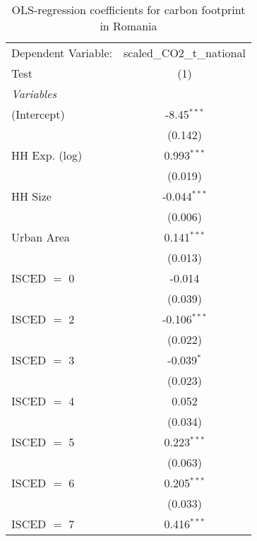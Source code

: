 
\begin{table}[htbp!]
   \centering
   \small
   \begin{adjustbox}{width = 1\textwidth, max height = 0.95\textheight, center}
      \begin{threeparttable}[b]
         \caption{\label{tab:OLS_2_ROU} OLS-regression coefficients for carbon footprint in Romania}
         \begin{tabular}{lc}
            \tabularnewline \midrule \midrule
            Dependent Variable: & scaled\_CO2\_t\_national\\     
            Test                & (1)\\  
            \midrule
            \emph{Variables}\\
            (Intercept)         & -8.45$^{***}$\\   
                                & (0.142)\\   
            HH Exp. (log)       & 0.993$^{***}$\\   
                                & (0.019)\\   
            HH Size             & -0.044$^{***}$\\   
                                & (0.006)\\   
            Urban Area          & 0.141$^{***}$\\   
                                & (0.013)\\   
            ISCED $=$ 0         & -0.014\\   
                                & (0.039)\\   
            ISCED $=$ 2         & -0.106$^{***}$\\   
                                & (0.022)\\   
            ISCED $=$ 3         & -0.039$^{*}$\\   
                                & (0.023)\\   
            ISCED $=$ 4         & 0.052\\   
                                & (0.034)\\   
            ISCED $=$ 5         & 0.223$^{***}$\\   
                                & (0.063)\\   
            ISCED $=$ 6         & 0.205$^{***}$\\   
                                & (0.033)\\   
            ISCED $=$ 7         & 0.416$^{***}$\\   

\end{tabular}
\end{threeparttable}
\end{adjustbox}
\end{table}
